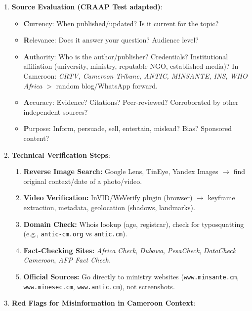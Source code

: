 \documentclass[11pt]{article}
\begin{document}
\begin{methode}
\begin{enumerate}
    \item \textbf{Source Evaluation (CRAAP Test adapted)}:
          \begin{itemize}
              \item \textbf{C}urrency: When published/updated? Is it current for the topic?
              \item \textbf{R}elevance: Does it answer your question? Audience level?
              \item \textbf{A}uthority: Who is the author/publisher? Credentials? Institutional affiliation (university, ministry, reputable NGO, established media)? In Cameroon: \textit{CRTV, Cameroon Tribune, ANTIC, MINSANTE, INS, WHO Africa} $>$ random blog/WhatsApp forward.
              \item \textbf{A}ccuracy: Evidence? Citations? Peer-reviewed? Corroborated by other independent sources?
              \item \textbf{P}urpose: Inform, persuade, sell, entertain, mislead? Bias? Sponsored content?
          \end{itemize}
    \item \textbf{Technical Verification Steps}:
          \begin{enumerate}
              \item \textbf{Reverse Image Search:} Google Lens, TinEye, Yandex Images $\rightarrow$ find original context/date of a photo/video.
              \item \textbf{Video Verification:} InVID/WeVerify plugin (browser) $\rightarrow$ keyframe extraction, metadata, geolocation (shadows, landmarks).
              \item \textbf{Domain Check:} Whois lookup (age, registrar), check for typosquatting (e.g., \texttt{antic-cm.org} vs \texttt{antic.cm}).
              \item \textbf{Fact-Checking Sites:} \textit{Africa Check}, \textit{Dubawa}, \textit{PesaCheck}, \textit{DataCheck Cameroon}, \textit{AFP Fact Check}.
              \item \textbf{Official Sources:} Go directly to ministry websites (\texttt{www.minsante.cm}, \texttt{www.minesec.cm}, \texttt{www.antic.cm}), not screenshots.
          \end{enumerate}
    \item \textbf{Red Flags for Misinformation in Cameroon Context}:

\end{enumerate}
\end{methode}
\end{document}
